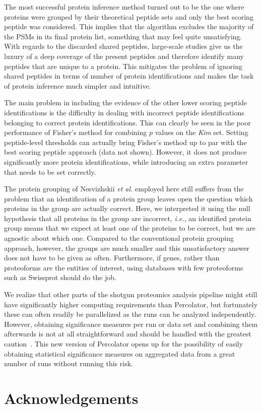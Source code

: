 \documentclass{article}
\begin{document}
The most successful protein inference method turned out to be the one
where proteins were grouped by their theoretical peptide sets and only
the best scoring peptide was considered. This implies that the
algorithm excludes the majority of the PSMs in its final protein list,
something that may feel quite unsatisfying. With regards to the
discarded shared peptides, large-scale studies give us the luxury of a
deep coverage of the present peptides and therefore identify many
peptides that are unique to a protein. This mitigates the problem of
ignoring shared peptides in terms of number of protein identifications
and makes the task of protein inference much simpler and intuitive.

The main problem in including the evidence of the other lower scoring
peptide identifications is the difficulty in dealing with incorrect
peptide identifications belonging to correct protein identifications.
This can clearly be seen in the poor performance of Fisher's method
for combining $p$ values on the {\em Kim} set. Setting
peptide-level thresholds can actually bring Fisher's method up to par
with the best scoring peptide approach (data not shown). However,
it does not produce significantly more protein identifications,
while introducing an extra parameter that needs to be set correctly.

The protein grouping of Nesvizhskii {\em et al.} employed here still
suffers from the problem that an identification of a protein group
leaves open the question which proteins in the group are actually
correct. Here, we interpreted it using the null hypothesis that all
proteins in the group are incorrect, {\em i.e.}, an identified protein
group means that we expect at least one of the proteins to be correct,
but we are agnostic about which one. Compared to the conventional
protein grouping approach, however, the groups are much smaller and
this unsatisfactory answer does not have to be given as often.
Furthermore, if genes, rather than proteoforms are the entities of
interest, using databases with few proteoforms such as Swissprot
should do the job.

We realize that other parts of the shotgun proteomics analysis
pipeline might still have significantly higher computing requirements
than Percolator, but fortunately these can often readily be
parallelized as the runs can be analyzed independently. However,
obtaining significance measures per run or data set and combining them
afterwards is not at all straightforward and should be handled with
the greatest caution~\cite{serang2015solution}. This new version of
Percolator opens up for the possibility of easily obtaining
statistical significance measures on aggregated data from a great
number of runs without running this risk.

\section*{Acknowledgements}


{} 

\end{document}
